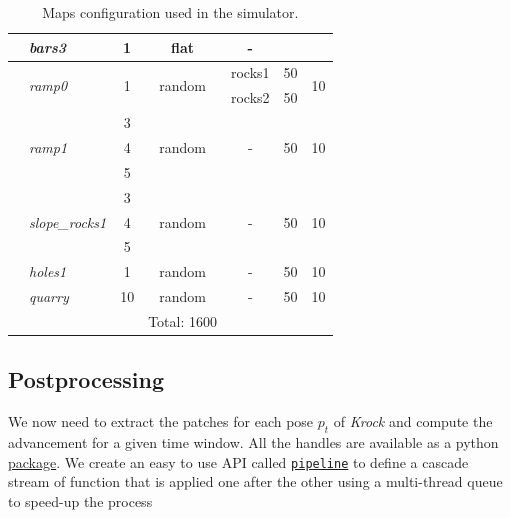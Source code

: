 \documentclass[../document.tex]{subfiles}
\begin{document}
\begin{table}[H]
\begin{tabular}[]{@{}llccccc@{}}
      \hline
      &\emph{bars3} & 1 & flat  & - &  &  \\
      \hline
      &\multirow{2}{*}{\emph{ramp0}} & \multirow{2}{*}{1} & \multirow{2}{*}{random} & rocks1 & 50 & \multirow{2}{*}{10} \\
      &&&& rocks2 & 50 &  \\
      \hline
      &\multirow{3}{*}{\emph{ramp1}} & 3 & \multirow{3}{*}{random} & \multirow{3}{*}{-} & \multirow{3}{*}{50} & \multirow{3}{*}{10} \\
      && 4 &&&& \\
      && 5 &&&& \\
      \hline 
      &\multirow{3}{*}{\emph{slope\_rocks1}} & 3 & \multirow{3}{*}{random} & \multirow{3}{*}{-} & \multirow{3}{*}{50} & \multirow{3}{*}{10} \\
      && 4 &&&& \\
      && 5 &&&& \\
      \hline
      &\emph{holes1} & 1 &random & - & 50 & 10 \\
      \hline
      &\emph{quarry} & 10 &random & - & 50 & 10 \\
      &&& Total: 1600 \\ 
      \bottomrule   
  
    \end{tabular}
    \caption{Maps configuration used in the simulator.}
  
  \end{table}
  


\subsection{Postprocessing}
We now need to extract the patches for each pose $p_t$ of \emph{Krock} and compute the advancement for a given time window. All the handles are available as a python \href{https://github.com/FrancescoSaverioZuppichini/Master-Thesis/tree/master/core/utilities/postprocessing/handlers}{package}. We create an easy to use API called \href{https://github.com/FrancescoSaverioZuppichini/Master-Thesis/tree/master/core/utilities/pipeline}{\texttt{pipeline}} to define a cascade stream of function that is applied one after the other using a multi-thread queue to speed-up the process
\end{document}
